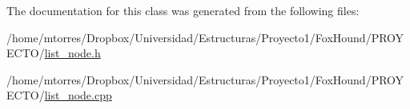 The documentation for this class was generated from the following files\-:\begin{DoxyCompactItemize}
\item 
/home/mtorres/\-Dropbox/\-Universidad/\-Estructuras/\-Proyecto1/\-Fox\-Hound/\-P\-R\-O\-Y\-E\-C\-T\-O/\hyperlink{list__node_8h}{list\-\_\-node.\-h}\item 
/home/mtorres/\-Dropbox/\-Universidad/\-Estructuras/\-Proyecto1/\-Fox\-Hound/\-P\-R\-O\-Y\-E\-C\-T\-O/\hyperlink{list__node_8cpp}{list\-\_\-node.\-cpp}\end{DoxyCompactItemize}
